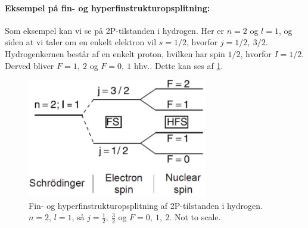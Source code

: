 \paragraph{Eksempel på fin- og hyperfinstrukturopsplitning:} Som eksempel kan vi se på 2P-tilstanden i hydrogen. Her er $n = 2$ og $l = 1$, og siden at vi taler om en enkelt elektron vil $s = 1/2$, hvorfor $j = 1/2,\: 3/2$. Hydrogenkernen består af en enkelt proton, hvilken har spin $1/2$, hvorfor $I = 1/2$. Derved bliver $F = 1,\: 2$ og $F = 0,\: 1$ hhv.. Dette kan ses af \cref{fig:Q16_HyperFineSplittingOf2PstateInHydrogen}.
\begin{figure}[!h]
    \centering
    \includegraphics[width=0.70\textwidth]{Q16/images/HyperFineSplittingOf2PstateInHydrogen.PNG}
    \caption{Fin- og hyperfinstrukturopsplitning af 2P-tilstanden i hydrogen. $n = 2$, $l = 1$, så $j = \frac{1}{2}, \: \frac{3}{2}$ og $F = 0,\: 1,\: 2$. Not to scale.}
    \label{fig:Q16_HyperFineSplittingOf2PstateInHydrogen}
\end{figure}